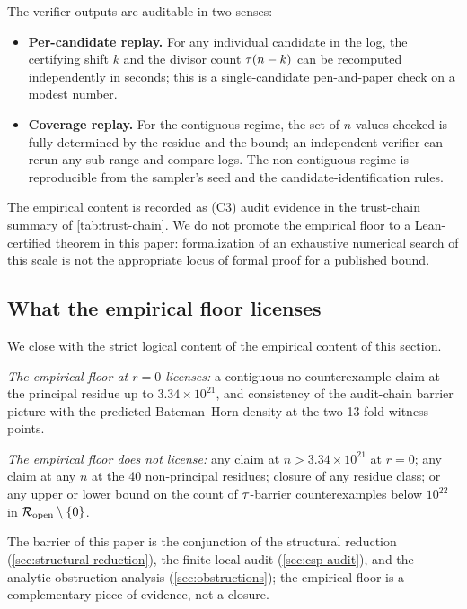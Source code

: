 The verifier outputs are auditable in two senses:
\begin{itemize}[leftmargin=*]
\item \textbf{Per-candidate replay.} For any individual candidate
  in the log, the certifying shift $k$ and the divisor count
  $\tau(n - k)$ can be recomputed independently in seconds; this
  is a single-candidate pen-and-paper check on a modest number.
\item \textbf{Coverage replay.} For the contiguous regime, the set
  of $n$ values checked is fully determined by the residue and the
  bound; an independent verifier can rerun any sub-range and
  compare logs. The non-contiguous regime is reproducible from the
  sampler's seed and the candidate-identification rules.
\end{itemize}

The empirical content is recorded as (C3) audit evidence in the
trust-chain summary of \cref{tab:trust-chain}. We do not promote
the empirical floor to a Lean-certified theorem in this paper:
formalization of an exhaustive numerical search of this scale is
not the appropriate locus of formal proof for a published bound.

\subsection{What the empirical floor licenses}
\label{sec:empirical-license}

We close with the strict logical content of the empirical content
of this section.

\emph{The empirical floor at $r = 0$ licenses:} a contiguous
no-counterexample claim at the principal residue up to $3.34
\times 10^{21}$, and consistency of the audit-chain barrier
picture with the predicted Bateman--Horn density at the two
13-fold witness points.

\emph{The empirical floor does not license:} any claim at $n >
3.34 \times 10^{21}$ at $r = 0$; any claim at any $n$ at the 40
non-principal residues; closure of any residue class; or any
upper or lower bound on the count of $\tau$-barrier
counterexamples below $10^{22}$ in $\mathcal{R}_{\mathrm{open}} \setminus \{0\}$.

The barrier of this paper is the conjunction of the structural
reduction (\cref{sec:structural-reduction}), the finite-local audit
(\cref{sec:csp-audit}), and the analytic obstruction analysis
(\cref{sec:obstructions}); the empirical floor is a complementary
piece of evidence, not a closure.

